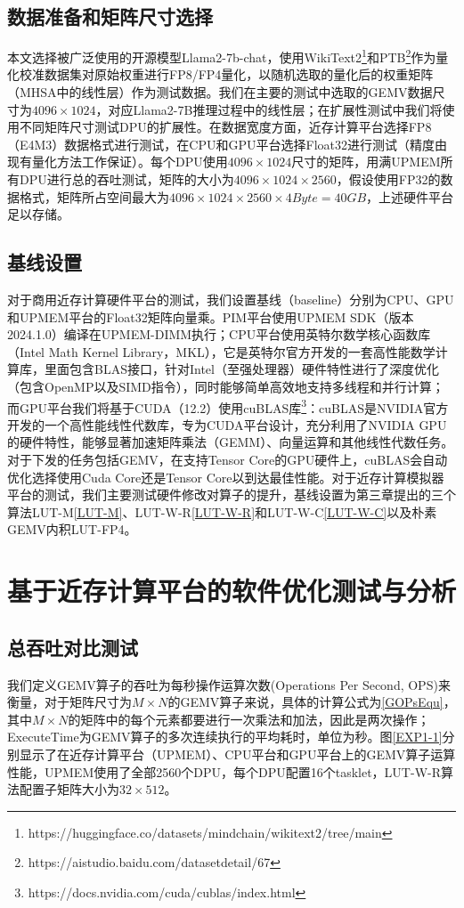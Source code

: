 \subsection{数据准备和矩阵尺寸选择}
本文选择被广泛使用的开源模型Llama2-7b-chat，使用WikiText2\footnote{https://huggingface.co/datasets/mindchain/wikitext2/tree/main}和PTB\footnote{https://aistudio.baidu.com/datasetdetail/67}作为量化校准数据集对原始权重进行FP8/FP4量化，以随机选取的量化后的权重矩阵（MHSA中的线性层）作为测试数据。我们在主要的测试中选取的GEMV数据尺寸为$4096\times 1024$，对应Llama2-7B推理过程中的线性层；在扩展性测试中我们将使用不同矩阵尺寸测试DPU的扩展性。在数据宽度方面，近存计算平台选择FP8（E4M3）数据格式进行测试，在CPU和GPU平台选择Float32进行测试（精度由现有量化方法工作保证）。每个DPU使用$4096\times 1024$尺寸的矩阵，用满UPMEM所有DPU进行总的吞吐测试，矩阵的大小为$4096\times 1024\times 2560$，假设使用FP32的数据格式，矩阵所占空间最大为$4096\times 1024\times 2560\times 4Byte=40GB$，上述硬件平台足以存储。

\subsection{基线设置}
对于商用近存计算硬件平台的测试，我们设置基线（baseline）分别为CPU、GPU和UPMEM平台的Float32矩阵向量乘。PIM平台使用UPMEM SDK（版本 2024.1.0）编译在UPMEM-DIMM执行；CPU平台使用英特尔数学核心函数库（Intel Math Kernel Library，MKL）\cite{IntelMKL}，它是英特尔官方开发的一套高性能数学计算库，里面包含BLAS接口，针对Intel（至强处理器）硬件特性进行了深度优化（包含OpenMP以及SIMD指令），同时能够简单高效地支持多线程和并行计算；而GPU平台我们将基于CUDA（12.2）使用cuBLAS库\footnote{https://docs.nvidia.com/cuda/cublas/index.html}：cuBLAS是NVIDIA官方开发的一个高性能线性代数库，专为CUDA平台设计，充分利用了NVIDIA GPU的硬件特性，能够显著加速矩阵乘法（GEMM）、向量运算和其他线性代数任务。对于下发的任务包括GEMV，在支持Tensor Core的GPU硬件上，cuBLAS会自动优化选择使用Cuda Core还是Tensor Core以到达最佳性能。对于近存计算模拟器平台的测试，我们主要测试硬件修改对算子的提升，基线设置为第三章提出的三个算法LUT-M\ref{LUT-M}、LUT-W-R\ref{LUT-W-R}和LUT-W-C\ref{LUT-W-C}以及朴素GEMV内积LUT-FP4。

\section{基于近存计算平台的软件优化测试与分析}

\subsection{总吞吐对比测试}
我们定义GEMV算子的吞吐为每秒操作运算次数(Operations Per Second, OPS)来衡量，对于矩阵尺寸为$M\times N$的GEMV算子来说，具体的计算公式为\ref{GOPsEqu}，其中$M\times N$的矩阵中的每个元素都要进行一次乘法和加法，因此是两次操作；ExecuteTime为GEMV算子的多次连续执行的平均耗时，单位为秒。图\ref{EXP1-1}分别显示了在近存计算平台（UPMEM）、CPU平台和GPU平台上的GEMV算子运算性能，UPMEM使用了全部2560个DPU，每个DPU配置16个tasklet，LUT-W-R算法配置子矩阵大小为$32\times 512$。

